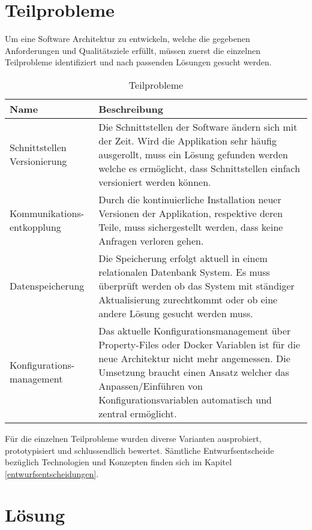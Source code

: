 \section{Teilprobleme}	

Um eine Software Architektur zu entwickeln, welche die gegebenen Anforderungen und Qualitätsziele erfüllt, müssen zuerst die einzelnen Teilprobleme identifiziert und nach passenden Lösungen gesucht werden.

\begin{table}[H]
	\centering
	\caption{Teilprobleme}
	\begin{tabular}{ | p{4cm} | p{11cm} | }
		\toprule
		{\textbf{Name}} & {\textbf{Beschreibung}} \\
		\midrule
		Schnittstellen Versionierung & Die Schnittstellen der Software ändern sich mit der Zeit. Wird die Applikation sehr häufig ausgerollt, muss ein Lösung gefunden werden welche es ermöglicht, dass Schnittstellen einfach versioniert werden können.\\ \hline
		Kommunikations- entkopplung &  Durch die kontinuierliche Installation neuer Versionen der Applikation, respektive deren Teile, muss sichergestellt werden, dass keine Anfragen verloren gehen.\\ \hline
		Datenspeicherung &  Die Speicherung erfolgt aktuell in einem relationalen Datenbank System. Es muss überprüft werden ob das System mit ständiger Aktualisierung zurechtkommt oder ob eine andere Lösung gesucht werden muss.\\ \hline
		Konfigurations- management & Das aktuelle Konfigurationsmanagement über Property-Files oder Docker Variablen ist für die neue Architektur nicht mehr angemessen. Die Umsetzung braucht einen Ansatz welcher das Anpassen/Einführen von Konfigurationsvariablen automatisch und zentral ermöglicht. \\
		\bottomrule
	\end{tabular}
\end{table}

Für die einzelnen Teilprobleme wurden diverse Varianten ausprobiert, prototypisiert und schlussendlich bewertet. Sämtliche Entwurfsentscheide bezüglich Technologien und Konzepten finden sich im Kapitel \ref{entwurfsentscheidungen}.

\section{Lösung}

